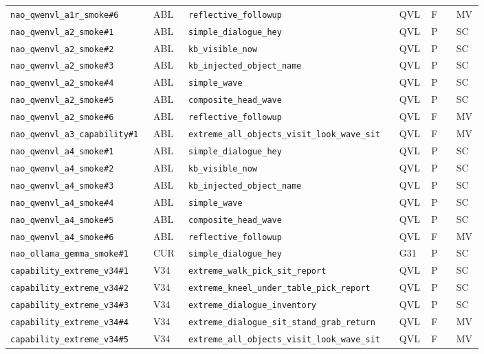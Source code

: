 \begin{landscape}
\begin{longtable}{@{}p{0.205\linewidth}p{0.075\linewidth}p{0.35\linewidth}p{0.06\linewidth}p{0.055\linewidth}p{0.055\linewidth}@{}}
\nolinkurl{nao_qwenvl_a1r_smoke#6} & ABL & \nolinkurl{reflective_followup} & QVL & F & MV\\
\nolinkurl{nao_qwenvl_a2_smoke#1} & ABL & \nolinkurl{simple_dialogue_hey} & QVL & P & SC\\
\nolinkurl{nao_qwenvl_a2_smoke#2} & ABL & \nolinkurl{kb_visible_now} & QVL & P & SC\\
\nolinkurl{nao_qwenvl_a2_smoke#3} & ABL & \nolinkurl{kb_injected_object_name} & QVL & P & SC\\
\nolinkurl{nao_qwenvl_a2_smoke#4} & ABL & \nolinkurl{simple_wave} & QVL & P & SC\\
\nolinkurl{nao_qwenvl_a2_smoke#5} & ABL & \nolinkurl{composite_head_wave} & QVL & P & SC\\
\nolinkurl{nao_qwenvl_a2_smoke#6} & ABL & \nolinkurl{reflective_followup} & QVL & F & MV\\
\nolinkurl{nao_qwenvl_a3_capability#1} & ABL & \nolinkurl{extreme_all_objects_visit_look_wave_sit} & QVL & F & MV\\
\nolinkurl{nao_qwenvl_a4_smoke#1} & ABL & \nolinkurl{simple_dialogue_hey} & QVL & P & SC\\
\nolinkurl{nao_qwenvl_a4_smoke#2} & ABL & \nolinkurl{kb_visible_now} & QVL & P & SC\\
\nolinkurl{nao_qwenvl_a4_smoke#3} & ABL & \nolinkurl{kb_injected_object_name} & QVL & P & SC\\
\nolinkurl{nao_qwenvl_a4_smoke#4} & ABL & \nolinkurl{simple_wave} & QVL & P & SC\\
\nolinkurl{nao_qwenvl_a4_smoke#5} & ABL & \nolinkurl{composite_head_wave} & QVL & P & SC\\
\nolinkurl{nao_qwenvl_a4_smoke#6} & ABL & \nolinkurl{reflective_followup} & QVL & F & MV\\
\nolinkurl{nao_ollama_gemma_smoke#1} & CUR & \nolinkurl{simple_dialogue_hey} & G31 & P & SC\\
\nolinkurl{capability_extreme_v34#1} & V34 & \nolinkurl{extreme_walk_pick_sit_report} & QVL & P & SC\\
\nolinkurl{capability_extreme_v34#2} & V34 & \nolinkurl{extreme_kneel_under_table_pick_report} & QVL & P & SC\\
\nolinkurl{capability_extreme_v34#3} & V34 & \nolinkurl{extreme_dialogue_inventory} & QVL & P & SC\\
\nolinkurl{capability_extreme_v34#4} & V34 & \nolinkurl{extreme_dialogue_sit_stand_grab_return} & QVL & F & MV\\
\nolinkurl{capability_extreme_v34#5} & V34 & \nolinkurl{extreme_all_objects_visit_look_wave_sit} & QVL & F & MV\\

\end{longtable}
\end{landscape}
